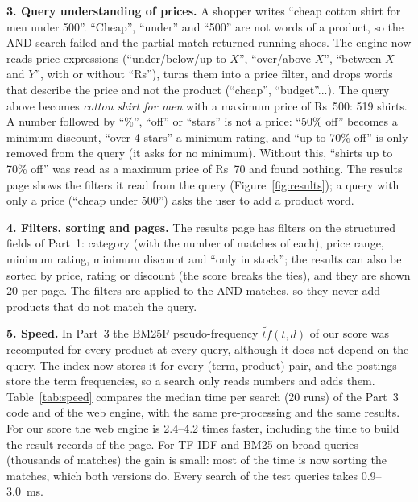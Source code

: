\documentclass[11pt,a4paper]{article}
\begin{document}
\textbf{3. Query understanding of prices.} A shopper writes ``cheap cotton shirt for men under 500''. ``Cheap'',
``under'' and ``500'' are not words of a product, so the AND search failed and the partial match returned running
shoes. The engine now reads price expressions (``under/below/up to $X$'', ``over/above $X$'', ``between $X$ and $Y$'',
with or without ``Rs''), turns them into a price filter, and drops words that describe the price and not the product
(``cheap'', ``budget''...). The query above becomes \emph{cotton shirt for men} with a maximum price of Rs~500: 519
shirts. A number followed by ``\%'', ``off'' or ``stars'' is not a price: ``50\% off'' becomes a minimum discount,
``over 4 stars'' a minimum rating, and ``up to 70\% off'' is only removed from the query (it asks for no minimum).
Without this, ``shirts up to 70\% off'' was read as a maximum price of Rs~70 and found nothing. The results page shows
the filters it read from the query (Figure~\ref{fig:results}); a query with only a price (``cheap under 500'') asks the
user to add a product word.

\textbf{4. Filters, sorting and pages.} The results page has filters on the structured fields of Part~1: category
(with the number of matches of each), price range, minimum rating, minimum discount and ``only in stock''; the results
can also be sorted by price, rating or discount (the score breaks the ties), and they are shown 20 per page. The
filters are applied to the AND matches, so they never add products that do not match the query.

\textbf{5. Speed.} In Part~3 the BM25F pseudo-frequency $\widetilde{tf}(t,d)$ of our score was recomputed for every
product at every query, although it does not depend on the query. The index now stores it for every (term, product)
pair, and the postings store the term frequencies, so a search only reads numbers and adds them. Table~\ref{tab:speed}
compares the median time per search (20 runs) of the Part~3 code and of the web engine, with the same pre-processing
and the same results. For our score the web engine is 2.4--4.2 times faster, including the time
to build the result records of the page. For TF-IDF and BM25 on broad queries (thousands of matches) the gain is small:
most of the time is now sorting the matches, which both versions do. Every search of the test queries takes
0.9--3.0~ms.
\end{document}
